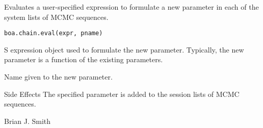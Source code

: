 \begin{Description}\relax
Evaluates a user-specified expression to formulate a new parameter in each of
the system lists of MCMC sequences.
\end{Description}
\begin{Usage}
\begin{verbatim}
boa.chain.eval(expr, pname)
\end{verbatim}
\end{Usage}
\begin{Arguments}
\begin{ldescription}
\item[\code{expr}] S expression object used to formulate the new parameter.
Typically, the new parameter is a function of the existing parameters.
\item[\code{pname}] Name given to the new parameter.
\end{ldescription}
\end{Arguments}
\begin{Section}{Side Effects}
The specified parameter is added to the session lists of MCMC sequences.
\end{Section}
\begin{Author}\relax
Brian J. Smith
\end{Author}

